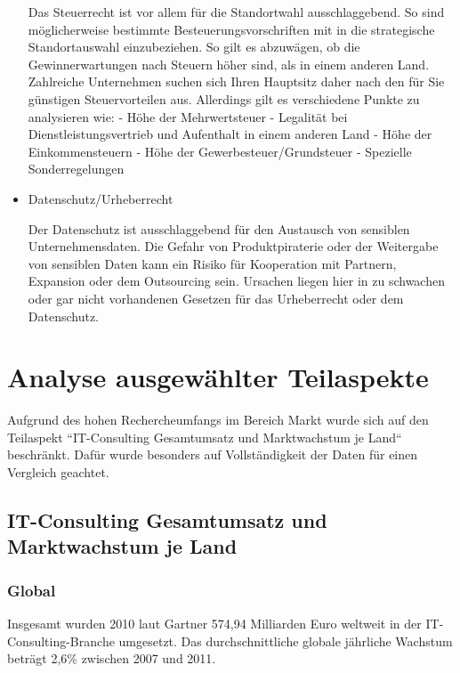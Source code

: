 \begin{itemize}
 Das Steuerrecht ist vor allem für die Standortwahl ausschlaggebend. 
 So sind möglicherweise bestimmte Besteuerungsvorschriften mit in die strategische Standortauswahl einzubeziehen. So gilt es abzuwägen, ob die Gewinnerwartungen nach Steuern höher sind, als in einem anderen Land. Zahlreiche Unternehmen suchen sich Ihren Hauptsitz daher nach den für Sie günstigen Steuervorteilen aus.
 Allerdings gilt es verschiedene Punkte zu analysieren wie:
 - Höhe der Mehrwertsteuer
 - Legalität bei Dienstleistungsvertrieb und Aufenthalt in einem anderen Land
 - Höhe der Einkommensteuern
 - Höhe der Gewerbesteuer/Grundsteuer
 - Spezielle Sonderregelungen
  \\
\item {Datenschutz/Urheberrecht}

  Der Datenschutz ist ausschlaggebend für den Austausch von sensiblen Unternehmensdaten. 
  Die Gefahr von Produktpiraterie oder der Weitergabe von sensiblen Daten kann ein Risiko für Kooperation mit Partnern, Expansion oder dem Outsourcing sein. Ursachen liegen hier in zu schwachen oder gar nicht vorhandenen Gesetzen für das Urheberrecht oder dem Datenschutz.
  
  \end{itemize}

\section{Analyse ausgewählter Teilaspekte}
Aufgrund des hohen Rechercheumfangs im Bereich Markt wurde sich auf den Teilaspekt ``IT-Consulting Gesamtumsatz und Marktwachstum je Land`` beschränkt. Dafür wurde besonders auf Vollständigkeit der Daten für einen Vergleich geachtet. 
\subsection*{IT-Consulting Gesamtumsatz und Marktwachstum je Land}
\label{subsubsec:Gesamtumsatz}


\subsubsection* {Global}

Insgesamt wurden 2010 laut Gartner 574,94 Milliarden Euro weltweit in der IT-Consulting-Branche umgesetzt. \cite{itConsultingGlobal} Das durchschnittliche globale jährliche Wachstum beträgt 2,6\% zwischen 2007 und 2011.\cite{globalGartner}

